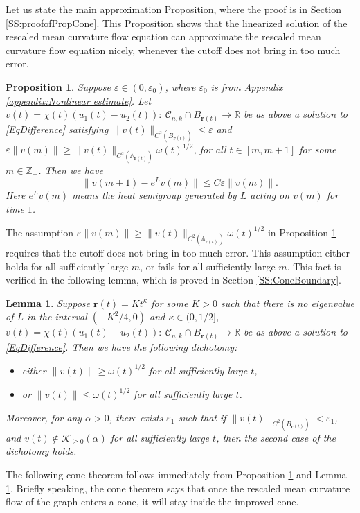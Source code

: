 \documentclass[11pt]{amsart}
\numberwithin{equation}{section}
\newtheorem{proposition}[theorem]{Proposition}
\newtheorem{lemma}[theorem]{Lemma}
\numberwithin{equation}{section}
\newcommand{\eps}{\varepsilon}
\newcommand{\br}{\mathbf{r}}
\newcommand{\cC}{\mathcal{C}}
\newcommand{\cK}{\mathcal{K}}
\newcommand{\R}{\mathbb{R}}
\begin{document}
	Let us state the main approximation Proposition, where the proof is in Section \ref{SS:proofofPropCone}. This Proposition shows that the linearized solution of the rescaled mean curvature flow equation can approximate the rescaled mean curvature flow equation nicely, whenever the cutoff does not bring in too much error.
	\begin{proposition}\label{PropApproximation} 
		Suppose $\eps\in(0,\eps_0)$, where $\eps_0$ is from Appendix \ref{appendix:Nonlinear estimate}. Let $v( t)=\chi(t)(u_1( t)-u_2(t)):\ \cC_{n,k}\cap B_{\br(t)}\to \R$ be as above a solution to \eqref{EqDifference} satisfying $\|v(t)\|_{C^2(B_{\br(t)})}\leq \eps$ and  $\eps\| v(m)\|\geq \|v(t)\|_{C^2(\mathbb A_{\mathbf r(t)})}\omega(t)^{1/2}$,  for all $t\in [m,{m+1}]$ for some  $m\in\mathbb Z_+$. 
		Then we have 
		$$	\|v({m+1})-e^{L}v(m)\|\leq C\eps\|v(m)\|. $$
		Here $e^Lv(m)$ means the heat semigroup generated by $L$ acting on $v(m)$ for time $1$.
	\end{proposition}
	The assumption $\eps\| v(m)\|\geq \|v(t)\|_{C^2(\mathbb A_{\mathbf r(t)})}\omega(t)^{1/2}$ in Proposition \ref{PropApproximation} requires that the cutoff does not bring in too much error. This assumption either holds for all sufficiently large $m$, or fails for all sufficiently large $m$. This fact is verified in the following lemma, which is proved in Section \ref{SS:ConeBoundary}.
	\begin{lemma}\label{LmContinuation}
		Suppose $\br(t)=Kt^{\kappa}$ for some $K>0$ such that there is no eigenvalue of $L$ in the interval $(-K^2/4,0)$ and $\kappa\in (0,1/2]$, $v(t)=\chi(t)(u_1( t)-u_2(t)):\ \cC_{n,k}\cap B_{\br(t)}\to \R$ be as above a solution to \eqref{EqDifference}. Then we have the following dichotomy:
		\begin{itemize}
			\item either $\|v(t)\|\geq \omega(t)^{1/2}$ for all sufficiently large $t$,
			\item or $\|v(t)\|\leq \omega(t)^{1/2}$ for all sufficiently large $t$.
		\end{itemize} 
		Moreover, for any $\alpha>0$, there exists $\eps_1$ such that if $\|v(t)\|_{C^2(B_{\br(t)})}<\eps_1$, and $v(t)\not \in \cK_{\geq 0}(\alpha)$ for all sufficiently large $t$, then the second case of the dichotomy holds.
	\end{lemma}
	
	The following cone theorem follows immediately from Proposition \ref{PropApproximation} and Lemma \ref{LmContinuation}.  Briefly speaking, the cone theorem says that once the rescaled mean curvature flow of the graph enters a cone, it will stay inside the improved cone. 
	
\end{document}

